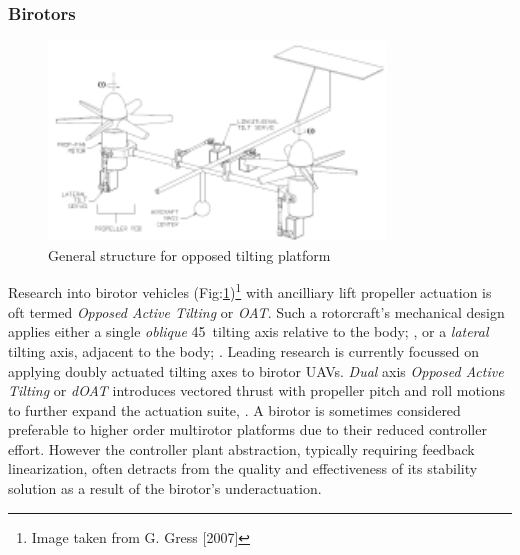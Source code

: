 \subsubsection*{Birotors}
\begin{figure}[hbtp]
\centering
\includegraphics[width=0.8\textwidth]{figs/dualaxistilt}
\caption{General structure for opposed tilting platform}
\label{fig:dualaxistilt}
\end{figure}
Research into birotor vehicles (Fig:\ref{fig:dualaxistilt})\footnote{Image taken from G. Gress [2007]\cite{gres2007}} with ancilliary lift propeller actuation is oft termed \emph{Opposed Active Tilting} or \emph{OAT}. Such a rotorcraft's mechanical design applies either a single \emph{oblique} 45\textdegree ~tilting axis relative to the body; \cite{smalltwotilting,obliquepitch,passiveobliquetilting}, or a \emph{lateral} tilting axis, adjacent to the body; \cite{tiltrotorUAV,adaptivebackstep,tiltrotorcontrol,tpheonix}. Leading research is currently focussed on applying doubly actuated tilting axes to birotor UAVs. \emph{Dual} axis \emph{Opposed Active Tilting} or \emph{dOAT} introduces vectored thrust with propeller pitch and roll motions to further expand the actuation suite, \cite{gres2007,opposedlateraldualaxis}. A birotor is sometimes considered preferable to higher order multirotor platforms due to their reduced controller effort. However the controller plant abstraction, typically requiring feedback linearization, often detracts from the quality and effectiveness of its stability solution as a result of the birotor's underactuation. 
\par
